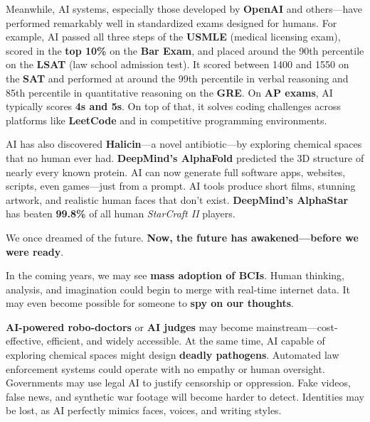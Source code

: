 \documentclass[a4paper,10pt,twocolumn]{memoir}
\begin{document}
Meanwhile, AI systems, especially those developed by \textbf{OpenAI} and others—have performed remarkably well in standardized exams designed for humans. For example, AI passed all three steps of the \textbf{USMLE} (medical licensing exam), scored in the \textbf{top 10\%} on the \textbf{Bar Exam}, and placed around the 90th percentile on the \textbf{LSAT} (law school admission test). It scored between 1400 and 1550 on the \textbf{SAT} and performed at around the 99th percentile in verbal reasoning and 85th percentile in quantitative reasoning on the \textbf{GRE}. On \textbf{AP exams}, AI typically scores \textbf{4s and 5s}. On top of that, it solves coding challenges across platforms like \textbf{LeetCode} and in competitive programming environments.

AI has also discovered \textbf{Halicin}—a novel antibiotic—by exploring chemical spaces that no human ever had. \textbf{DeepMind’s AlphaFold} predicted the 3D structure of nearly every known protein. AI can now generate full software apps, websites, scripts, even games—just from a prompt. AI tools produce short films, stunning artwork, and realistic human faces that don’t exist. \textbf{DeepMind’s AlphaStar} has beaten \textbf{99.8\%} of all human \textit{StarCraft II} players.

We once dreamed of the future. \textbf{Now, the future has awakened—before we were ready}.

In the coming years, we may see \textbf{mass adoption of BCIs}. Human thinking, analysis, and imagination could begin to merge with real-time internet data. It may even become possible for someone to \textbf{spy on our thoughts}.

\textbf{AI-powered robo-doctors} or \textbf{AI judges} may become mainstream—cost-effective, efficient, and widely accessible. At the same time, AI capable of exploring chemical spaces might design \textbf{deadly pathogens}. Automated law enforcement systems could operate with no empathy or human oversight. Governments may use legal AI to justify censorship or oppression. Fake videos, false news, and synthetic war footage will become harder to detect. Identities may be lost, as AI perfectly mimics faces, voices, and writing styles.
\end{document}
